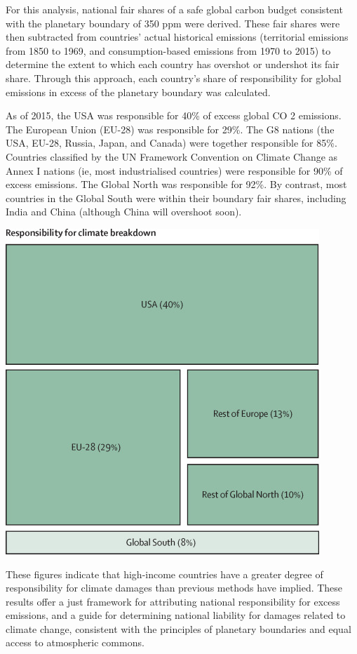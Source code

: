 \documentclass[
]{book}
\begin{document}
For this analysis, national fair shares of a safe global carbon budget consistent with the planetary boundary
of 350 ppm were derived. These fair shares were then subtracted from countries' actual historical emissions (territorial
emissions from 1850 to 1969, and consumption-based emissions from 1970 to 2015) to determine the extent to which
each country has overshot or undershot its fair share. Through this approach, each country's share of responsibility
for global emissions in excess of the planetary boundary was calculated.

As of 2015, the USA was responsible for 40\% of excess global CO 2 emissions. The European Union (EU-28)
was responsible for 29\%. The G8 nations (the USA, EU-28, Russia, Japan, and Canada) were together responsible
for 85\%. Countries classified by the UN Framework Convention on Climate Change as Annex I nations (ie, most
industrialised countries) were responsible for 90\% of excess emissions. The Global North was responsible for 92\%.
By contrast, most countries in the Global South were within their boundary fair shares, including India and China
(although China will overshoot soon).

\includegraphics{fig/Hickel_fair_shares.jpg}

These figures indicate that high-income countries have a greater degree of responsibility for climate
damages than previous methods have implied. These results offer a just framework for attributing national
responsibility for excess emissions, and a guide for determining national liability for damages related to climate
change, consistent with the principles of planetary boundaries and equal access to atmospheric commons.
\end{document}
